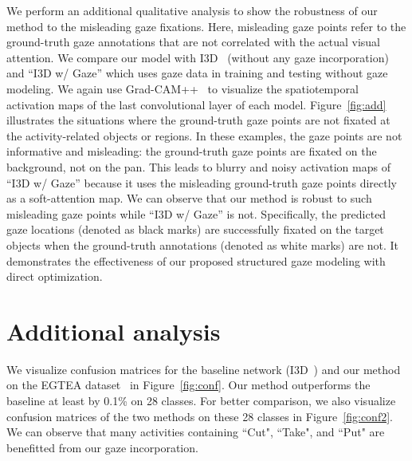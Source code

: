 \documentclass[10pt,twocolumn,letterpaper]{article}
\begin{document}
We perform an additional qualitative analysis to show the robustness of our method to the misleading gaze fixations. Here, misleading gaze points refer to the ground-truth gaze annotations that are not correlated with the actual visual attention. We compare our model with I3D~\cite{carreira2017quo} (without any gaze incorporation) and ``I3D w/ Gaze'' which uses gaze data in training and testing without gaze modeling. We again use Grad-CAM++~\cite{chattopadhay2018grad} to visualize the spatiotemporal activation maps of the last convolutional layer of each model. Figure~\ref{fig:add} illustrates the situations where the ground-truth gaze points are not fixated at the activity-related objects or regions. In these examples, the gaze points are not informative and misleading: the ground-truth gaze points are fixated on the background, not on the pan. This leads to blurry and noisy activation maps of ``I3D w/ Gaze'' because it uses the misleading ground-truth gaze points directly as a soft-attention map. We can observe that our method is robust to such misleading gaze points while ``I3D w/ Gaze'' is not. Specifically, the predicted gaze locations (denoted as black marks) are successfully fixated on the target objects when the ground-truth annotations (denoted as white marks) are not. It demonstrates the effectiveness of our proposed structured gaze modeling with direct optimization.

\section{Additional analysis}
We visualize confusion matrices for the baseline network (I3D~\cite{carreira2017quo}) and our method on the EGTEA dataset~\cite{li2018eye} in Figure~\ref{fig:conf}. Our method outperforms the baseline at least by 0.1\% on 28 classes. For better comparison, we also visualize confusion matrices of the two methods on these 28 classes in Figure~\ref{fig:conf2}. We can observe that many activities containing ``Cut", ``Take", and ``Put" are benefitted from our gaze incorporation.

\begin{figure*}[htbp]
\centering
\hspace{-6pt}
  \hspace{0.6cm}
  \caption{Confusion matrices for the baseline (I3D~\cite{carreira2017quo}) and ours on the EGTEA dataset~\cite{li2018eye}.}
  \label{fig:conf}
\end{figure*}
\end{document}
